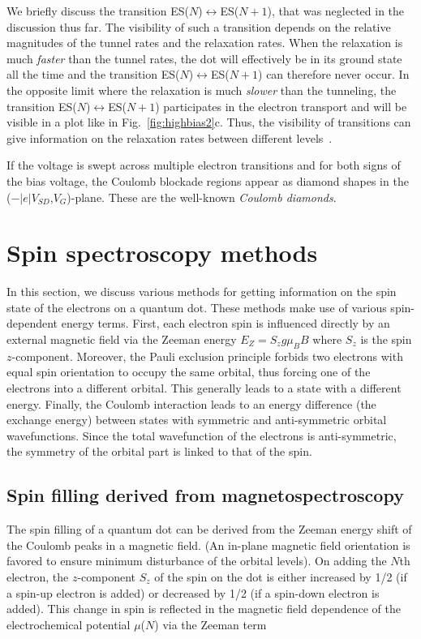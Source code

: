 \documentclass[rmp,twocolumn,aps]{revtex4}
\begin{document}
We briefly discuss the transition
ES($N$)$\leftrightarrow$ES($N\!+\!1$), that was neglected in the
discussion thus far. The visibility of such a transition depends
on the relative magnitudes of the tunnel rates and the relaxation
rates. When the relaxation is much \textit{faster} than the tunnel
rates, the dot will effectively be in its ground state all the
time and the transition ES($N$)$\leftrightarrow$ES($N\!+\!1$) can
therefore never occur. In the opposite limit where the relaxation
is much \textit{slower} than the tunneling, the transition
ES($N$)$\leftrightarrow$ES($N\!+\!1$) participates in the electron
transport and will be visible in a plot like in
Fig.~\ref{fig:highbias2}c. Thus, the visibility of transitions can
give information on the relaxation rates between different
levels~\cite{FujisawaPRL02}.

If the voltage is swept across multiple electron transitions and
for both signs of the bias voltage, the Coulomb blockade regions
appear as diamond shapes in the
($-\left|e\right|V_{SD}$,${V_G}$)-plane. These are the well-known
\textit{Coulomb diamonds}.

\section{Spin spectroscopy methods}
\label{Section:SpinSpectroscopy} In this section, we discuss
various methods for getting information on the spin state of the
electrons on a quantum dot. These methods make use of various
spin-dependent energy terms. First, each electron spin is
influenced directly by an external magnetic field via the Zeeman
energy $E_Z=S_z g \mu_B B$ where $S_z$ is the spin $z$-component.
Moreover, the Pauli exclusion principle forbids two electrons with
equal spin orientation to occupy the same orbital, thus forcing
one of the electrons into a different orbital. This generally
leads to a state with a different energy. Finally, the Coulomb
interaction leads to an energy difference (the exchange energy)
between states with symmetric and anti-symmetric orbital
wavefunctions. Since the total wavefunction of the electrons is
anti-symmetric, the symmetry of the orbital part is linked to that
of the spin.

\subsection{Spin filling derived from magnetospectroscopy}
The spin filling of a quantum dot can be derived from the Zeeman
energy shift of the Coulomb peaks in a magnetic field. (An
in-plane magnetic field orientation is favored to ensure minimum
disturbance of the orbital levels). On adding the $N$th electron,
the $z$-component $S_z$ of the spin on the dot is either increased
by 1/2 (if a spin-up electron is added) or decreased by 1/2 (if a
spin-down electron is added). This change in spin is reflected in
the magnetic field dependence of the electrochemical potential
$\mu$($N$) via the Zeeman term
\end{document}
